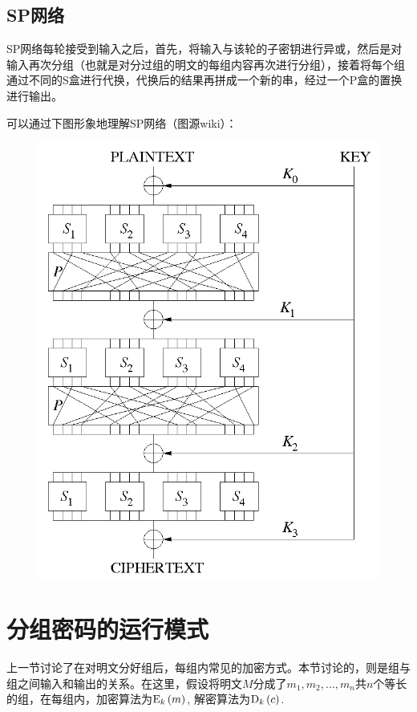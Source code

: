 \subsection{SP网络}
SP网络每轮接受到输入之后，首先，将输入与该轮的子密钥进行异或，然后是对输入再次分组（也就是对分过组的明文的每组内容再次进行分组），接着将每个组通过不同的S盒进行代换，代换后的结果再拼成一个新的串，经过一个P盒的置换进行输出。\par
可以通过下图形象地理解SP网络（图源wiki）：
\begin{figure}[H]
    \centering
    \includegraphics[scale=0.5]{chapters/chapter_3/SPN.png}
\end{figure}
\section{分组密码的运行模式}
上一节讨论了在对明文分好组后，每组内常见的加密方式。本节讨论的，则是组与组之间输入和输出的关系。在这里，假设将明文$M$分成了$m_1, m_2, \ldots, m_n$共$n$个等长的组，在每组内，加密算法为${\mathrm{E}_{k}\left({m}\right)}$, 解密算法为${\mathrm{D}_{k}\left({c}\right)}$.
